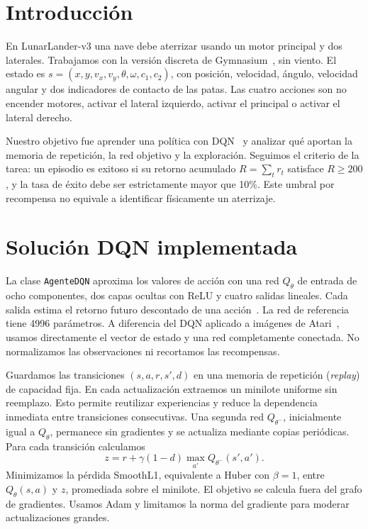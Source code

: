 \documentclass[conference]{IEEEtran}
\begin{document}
\section{Introducción}
En LunarLander-v3 una nave debe aterrizar usando un motor principal y dos laterales. Trabajamos con la versión discreta de Gymnasium~\cite{towers2024}, sin viento. El estado es $s=(x,y,v_x,v_y,\theta,\omega,c_1,c_2)$, con posición, velocidad, ángulo, velocidad angular y dos indicadores de contacto de las patas. Las cuatro acciones son no encender motores, activar el lateral izquierdo, activar el principal o activar el lateral derecho.

Nuestro objetivo fue aprender una política con DQN~\cite{mnih2015} y analizar qué aportan la memoria de repetición, la red objetivo y la exploración. Seguimos el criterio de la tarea: un episodio es exitoso si su retorno acumulado $R=\sum_t r_t$ satisface $R\geq200$, y la tasa de éxito debe ser estrictamente mayor que 10\%. Este umbral por recompensa no equivale a identificar físicamente un aterrizaje.

\section{Solución DQN implementada}
\label{sec:dqn}
La clase \texttt{AgenteDQN} aproxima los valores de acción con una red $Q_\theta$ de entrada de ocho componentes, dos capas ocultas con ReLU y cuatro salidas lineales. Cada salida estima el retorno futuro descontado de una acción~\cite{sutton2018}. La red de referencia tiene 4996 parámetros. A diferencia del DQN aplicado a imágenes de Atari~\cite{mnih2015}, usamos directamente el vector de estado y una red completamente conectada. No normalizamos las observaciones ni recortamos las recompensas.

Guardamos las transiciones $(s,a,r,s',d)$ en una memoria de repetición (\textit{replay}) de capacidad fija. En cada actualización extraemos un minilote uniforme sin reemplazo. Esto permite reutilizar experiencias y reduce la dependencia inmediata entre transiciones consecutivas. Una segunda red $Q_{\theta^-}$, inicialmente igual a $Q_\theta$, permanece sin gradientes y se actualiza mediante copias periódicas. Para cada transición calculamos
\begin{equation}
 z=r+\gamma(1-d)\max_{a'}Q_{\theta^-}(s',a').
\end{equation}
Minimizamos la pérdida SmoothL1, equivalente a Huber con $\beta=1$, entre $Q_\theta(s,a)$ y $z$, promediada sobre el minilote. El objetivo se calcula fuera del grafo de gradientes. Usamos Adam y limitamos la norma del gradiente para moderar actualizaciones grandes.
\end{document}
